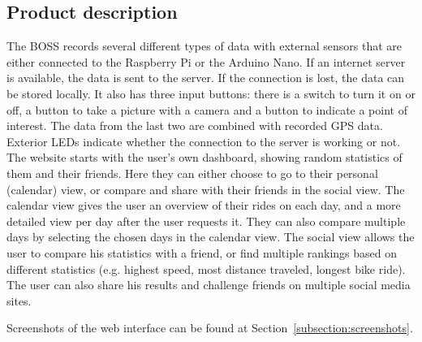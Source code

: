 \subsection{Product description}
The BOSS records several different types of data with external sensors that are either connected to the Raspberry Pi or the Arduino Nano. 
If an internet server is available, the data is sent to the server. If the connection is lost, the data can be stored locally.
It also has three input buttons: there is a switch to turn it on or off, a button to take a picture with a camera and a button to indicate a point of interest. 
The data from the last two are combined with recorded GPS data. Exterior LEDs indicate whether the connection to the server is working or not.
The website starts with the user’s own dashboard, showing random statistics of them and their friends. 
Here they can either choose to go to their personal (calendar) view, or compare and share with their friends in the social view. 
The calendar view gives the user an overview of their rides on each day, and a more detailed view per day after the user requests it. 
They can also compare multiple days by selecting the chosen days in the calendar view. 
The social view allows the user to compare his statistics with a friend, or find multiple rankings based on different statistics (e.g. highest speed, most distance traveled, longest bike ride).
The user can also share his results and challenge friends on multiple social media sites.

Screenshots of the web interface can be found at Section~\ref{subsection:screenshots}.
